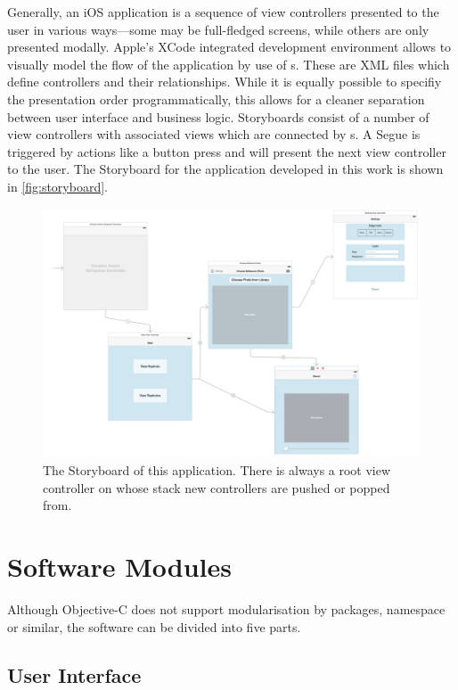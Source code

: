 Generally, an iOS application is a sequence of view controllers presented to the
user in various ways---some may be full-fledged screens, while others are only
presented modally. Apple's XCode integrated development environment allows to
visually model the flow of the application by use of s. These
are XML files which define controllers and their relationships. While
it is equally possible to specifiy the presentation order programmatically, this
allows for a cleaner separation between user interface and business logic.
Storyboards consist of a number of view controllers with associated views which
are connected by s. A Segue is triggered by actions like a button
press and will present the next view controller to the user. The Storyboard for
the application developed in this work is shown in \autoref{fig:storyboard}.

\begin{figure}[h]
   {\centering      
      \includegraphics[width=\textwidth]{gfx/storyboard.png}
      \caption[Storyboard example]{The Storyboard of this application. There is
         always a root view controller on whose stack new controllers are pushed or
      popped from.}
   \label{fig:storyboard}}
\end{figure}

\section{Software Modules}

Although Objective-C does not support modularisation by packages, namespace or
similar, the software can be divided into five parts.

\subsection{User Interface}

